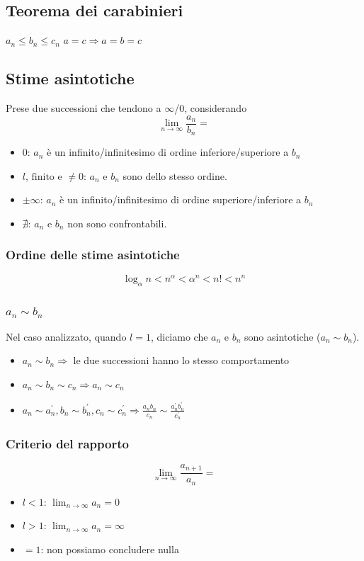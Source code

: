 \documentclass{report}
\begin{document}
    \subsection{Teorema dei carabinieri}
        $a_n \leq b_n \leq c_n$
        $a = c \Longrightarrow a = b = c$
    \subsection{Stime asintotiche}
        Prese due successioni che tendono a $\infty$/$0$, considerando 
        $$\lim_{n \to \infty}\frac{a_n}{b_n} = $$
    \begin{itemize}
        \item $0$: $a_n$ è un infinito/infinitesimo di ordine inferiore/superiore a $b_n$
        \item $l, \, \textrm{finito e } \neq 0$: $a_n$ e $b_n$ sono dello stesso ordine. \\
        \item $\pm \infty$: $a_n$ è un infinito/infinitesimo di ordine superiore/inferiore a $b_n$
        \item $\nexists$: $a_n$ e $b_n$ non sono confrontabili.
    \end{itemize}
    \subsubsection{Ordine delle stime asintotiche}
        $$\log_{\alpha}n < n^{\alpha} < \alpha^n < n! < n^n$$ 
    \subsubsection{$a_n \sim b_n$}
        Nel caso analizzato, quando $l = 1$, diciamo che $a_n$ e $b_n$ sono 
        asintotiche ($a_n \sim b_n$). \\
        \begin{itemize}
            \item $a_n \sim b_n \Longrightarrow$ le due successioni hanno lo stesso comportamento
            \item $a_n \sim b_n \sim c_n \Longrightarrow a_n \sim c_n$
            \item $a_n \sim a^{'}_n, b_n \sim b^{'}_n, c_n \sim c^{'}_n \Longrightarrow 
                \frac{a_nb_n}{c_n} \sim \frac{a^{'}_nb^{'}_n}{c^{'}_n}$
        \end{itemize}
    \subsubsection{Criterio del rapporto}
    $$\lim_{n \to \infty} \frac{a_{n+1}}{a_n} = $$
    \begin{itemize}
        \item $l < 1$: $\lim_{n \to \infty}a_n = 0$
        \item $l > 1$: $\lim_{n \to \infty}a_n = \infty$
        \item $= 1$: non possiamo concludere nulla
    \end{itemize}

        
\end{document}
